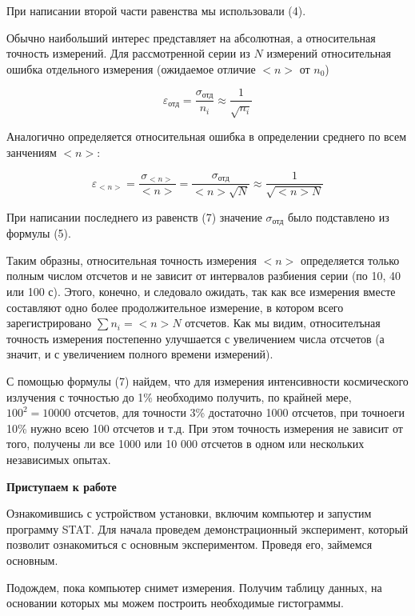 \documentclass[14pt]{article}
\begin{document}
\noindent При написании второй части равенства мы использовали (4).

Обычно наибольший интерес представляет на абсолютная, а относительная точность измерений. Для рассмотренной серии из $N$ измерений относительная ошибка отдельного измерения (ожидаемое отличие $<n>$ от $n_0$)

\begin{equation}
\varepsilon_{\text{отд}} = \frac{\sigma_{\text{отд}}}{n_i} \approx \frac{1}{\sqrt{n_i}}
\end{equation}

Аналогично определяется относительная ошибка в определении среднего по всем занчениям $<n>$:

\begin{equation}
\varepsilon_{<n>} = \frac{\sigma_{<n>}}{<n>} = \frac{\sigma_{\text{отд}}}{<n>\sqrt{N}} \approx \frac{1}{\sqrt{<n>N}}
\end{equation}

При написании последнего из равенств (7) значение $\sigma_{\text{отд}}$ было подставлено из формулы (5).

Таким образны, относительная точность измерения $<n>$ определяется только полным числом отсчетов и не зависит от интервалов разбиения серии (по 10, 40 или 100 с). Этого, конечно, и следовало ожидать, так как все измерения вместе составляют одно более продолжительное измерение, в котором всего зарегистрировано $\sum n_i = <n>N$ отсчетов. Как мы видим, относителъная точность измерения постепенно улучшается с увеличением числа отсчетов (а значит, и с увеличением полного времени измерений).

С помощью формулы (7) найдем, что для измерения интенсивности
космического излучения с точностью до 1\% необходимо получить, по крайней мере, $100^2 = 10000$ отсчетов, для точности 3\% достаточно 1000 отсчетов, при точноеги 10\% нужно всею 100 отсчетов и т.д. При этом точность измерения не зависит от того, получены ли все 1000 или 10 000 отсчетов в одном или нескольких независимых опытах.

\vspace{1cm}
\textbf{Приступаем к работе}

\vspace{0.5cm}
Ознакомившись с устройством установки, включим компьютер и запустим программу STAT. Для начала проведем демонстрационный эксперимент, который позволит ознакомиться с основным экспериментом. Проведя его, займемся основным. 

Подождем, пока компьютер снимет измерения. Получим таблицу данных, на основании которых мы можем построить необходимые гистограммы.
\end{document}
